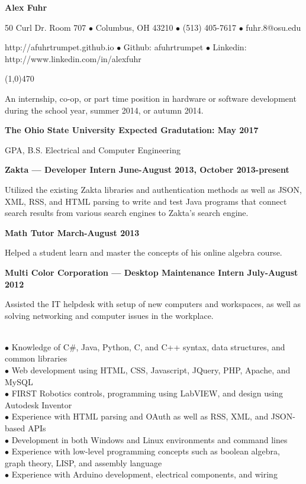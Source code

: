 \documentclass[10pt]{article}
\begin{document}
\centerline{{\LARGE \bf Alex Fuhr}}

\centerline{50 Curl Dr. Room 707 $\bullet$ Columbus, OH 43210 $\bullet$ (513) 405-7617 $\bullet$ fuhr.8@osu.edu}
\centerline{http://afuhrtrumpet.github.io $\bullet$ Github: afuhrtrumpet $\bullet$ Linkedin: http://www.linkedin.com/in/alexfuhr}
\noindent
\line(1,0){470}\\

\smallskip

\noindent
An internship, co-op, or part time position in hardware or software development during the school year, summer 2014, or autumn 2014.
\medskip

\smallskip

\centerline{{\large \bf The Ohio State University \hfill Expected Gradutation: May 2017}}
 GPA, B.S. Electrical and Computer Engineering
\medskip

\smallskip

\centerline{{\large \bf Zakta --- Developer Intern \hfill June-August 2013, October 2013-present}}
\noindent
Utilized the existing Zakta libraries and authentication methods as well as JSON, XML, RSS, and HTML parsing to write and test Java programs that connect search results from various search engines to Zakta's search engine.

\centerline{{\large \bf Math Tutor \hfill March-August 2013}}
\noindent
Helped a student learn and master the concepts of his online algebra course.

\centerline{{\large \bf Multi Color Corporation --- Desktop Maintenance Intern \hfill July-August 2012}}
\noindent
Assisted the IT helpdesk with setup of new computers and workspaces, as well as solving networking and computer issues in the workplace.
\medskip

\\
\smallskip
$\bullet$ Knowledge of C\#, Java, Python, C, and C++ syntax, data structures, and common libraries\\
$\bullet$ Web development using HTML, CSS, Javascript, JQuery, PHP, Apache, and MySQL\\
$\bullet$ FIRST Robotics controls, programming using LabVIEW, and design using Autodesk Inventor\\
$\bullet$ Experience with HTML parsing and OAuth as well as RSS, XML, and JSON-based APIs\\
$\bullet$ Development in both Windows and Linux environments and command lines\\
$\bullet$ Experience with low-level programming concepts such as boolean algebra, graph theory, LISP, and assembly language\\
$\bullet$ Experience with Arduino development, electrical components, and wiring
\medskip
\end{document}
